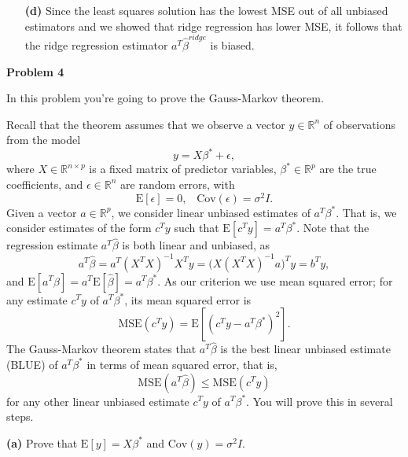 \documentclass[11pt]{article}
\def\E{\mathrm{E}}
\def\Cov{\mathrm{Cov}}
\newcommand{\R}{\mathbb{R}}
\def\hbeta{\hat{\beta}}
\begin{document}
\begin{framed}
\begin{enumerate}
\item[{\bf (d)}] Since the least squares solution has the lowest MSE out of all
unbiased estimators and we showed that ridge regression has lower MSE, it
follows that the ridge regression estimator $a^{T}\hat{{\beta}}^{ridge}$ is
biased.




\end{enumerate}
\end{framed}

\bigskip
\bigskip
\noindent
{\bf\large Problem 4}

\smallskip
\noindent
In this problem you're going to prove the Gauss-Markov theorem.

Recall that the theorem assumes that we observe a vector $y \in \R^n$ of observations
from the model
\begin{equation*}
y = X\beta^* + \epsilon,
\end{equation*}
where $X \in \R^{n\times p}$ is a fixed matrix of predictor variables, $\beta^* \in \R^p$
are the true coefficients, and $\epsilon \in \R^n$ are random errors, with 
\begin{equation*}
\E[\epsilon] = 0, \;\;\; \Cov(\epsilon) = \sigma^2 I.
\end{equation*}
Given a vector $a\in \R^p$, we consider linear unbiased estimates of $a^T \beta^*$. That is,
we consider estimates of the form $c^T y$ such that $\E[c^T y] = a^T \beta^*$. Note that
the regression estimate $a^T \hbeta$ is both linear and unbiased, as 
\begin{equation*}
a^T \hbeta = a^T (X^T X)^{-1} X^T y = \big( X (X^T X)^{-1} a \big)^T y = b^T y,
\end{equation*}
and $\E[a^T \hbeta] = a^T \E[\hbeta] = a^T \beta^*$. As our criterion we use mean squared
error; for any estimate $c^T y$ of $a^T \beta^*$, its mean squared error is
\begin{equation*}
\mathrm{MSE}(c^T y) = \E[(c^T y - a^T \beta^*)^2].
\end{equation*}
The Gauss-Markov theorem states that $a^T \hbeta$ is the best linear unbiased estimate (BLUE) 
of $a^T \beta^*$ in terms of mean squared error, that is,
\begin{equation*}
\mathrm{MSE}(a^T \hbeta) \leq \mathrm{MSE}(c^T y)
\end{equation*}
for any other linear unbiased estimate $c^T y$ of $a^T \beta^*$. You will prove this in
several steps.

\bigskip
\noindent
{\bf (a)} Prove that $\E[y]=X\beta^*$ and $\Cov(y)=\sigma^2 I$.
\end{document}
